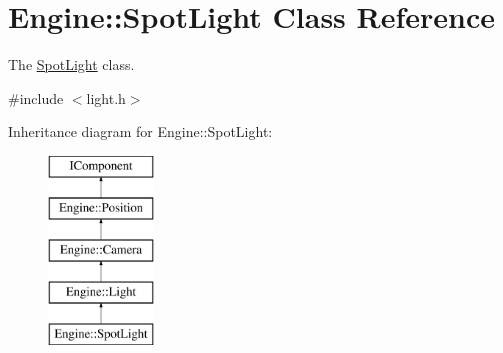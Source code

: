 \hypertarget{classEngine_1_1SpotLight}{}\section{Engine\+:\+:Spot\+Light Class Reference}
\label{classEngine_1_1SpotLight}


The \hyperlink{classEngine_1_1SpotLight}{Spot\+Light} class.  




{\ttfamily \#include $<$light.\+h$>$}

Inheritance diagram for Engine\+:\+:Spot\+Light\+:\begin{figure}[H]
\begin{center}
\leavevmode
\includegraphics[height=5.000000cm]{classEngine_1_1SpotLight}
\end{center}
\end{figure}
